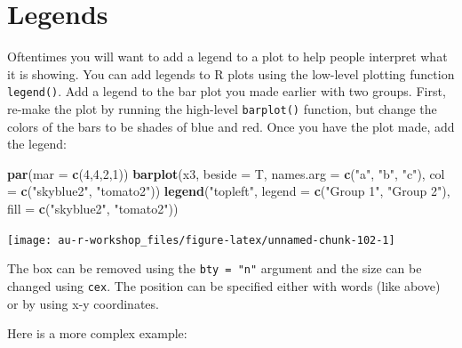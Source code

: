 \documentclass[]{book}
\newenvironment{Shaded}{\begin{snugshade}}{\end{snugshade}}
\newcommand{\KeywordTok}[1]{\textcolor[rgb]{0.13,0.29,0.53}{\textbf{#1}}}
\newcommand{\DataTypeTok}[1]{\textcolor[rgb]{0.13,0.29,0.53}{#1}}
\newcommand{\DecValTok}[1]{\textcolor[rgb]{0.00,0.00,0.81}{#1}}
\newcommand{\StringTok}[1]{\textcolor[rgb]{0.31,0.60,0.02}{#1}}
\newcommand{\NormalTok}[1]{#1}
\theoremstyle{definition}
\theoremstyle{definition}
\theoremstyle{definition}
\theoremstyle{remark}
\begin{document}
\section{Legends}\label{legends}

Oftentimes you will want to add a legend to a plot to help people
interpret what it is showing. You can add legends to R plots using the
low-level plotting function \texttt{legend()}. Add a legend to the bar
plot you made earlier with two groups. First, re-make the plot by
running the high-level \texttt{barplot()} function, but change the
colors of the bars to be shades of blue and red. Once you have the plot
made, add the legend:

\begin{Shaded}
\begin{Highlighting}[]
\KeywordTok{par}\NormalTok{(}\DataTypeTok{mar =} \KeywordTok{c}\NormalTok{(}\DecValTok{4}\NormalTok{,}\DecValTok{4}\NormalTok{,}\DecValTok{2}\NormalTok{,}\DecValTok{1}\NormalTok{))}
\KeywordTok{barplot}\NormalTok{(x3, }\DataTypeTok{beside =}\NormalTok{ T, }
        \DataTypeTok{names.arg =} \KeywordTok{c}\NormalTok{(}\StringTok{"a"}\NormalTok{, }\StringTok{"b"}\NormalTok{, }\StringTok{"c"}\NormalTok{),}
        \DataTypeTok{col =} \KeywordTok{c}\NormalTok{(}\StringTok{"skyblue2"}\NormalTok{, }\StringTok{"tomato2"}\NormalTok{))}
\KeywordTok{legend}\NormalTok{(}\StringTok{"topleft"}\NormalTok{, }\DataTypeTok{legend =} \KeywordTok{c}\NormalTok{(}\StringTok{"Group 1"}\NormalTok{, }\StringTok{"Group 2"}\NormalTok{),}
       \DataTypeTok{fill =} \KeywordTok{c}\NormalTok{(}\StringTok{"skyblue2"}\NormalTok{, }\StringTok{"tomato2"}\NormalTok{))}
\end{Highlighting}
\end{Shaded}

\begin{center}\texttt{[image: au-r-workshop\_files/figure-latex/unnamed-chunk-102-1]} \end{center}

The box can be removed using the \texttt{bty\ =\ "n"} argument and the
size can be changed using \texttt{cex}. The position can be specified
either with words (like above) or by using x-y coordinates.

Here is a more complex example:
\end{document}
